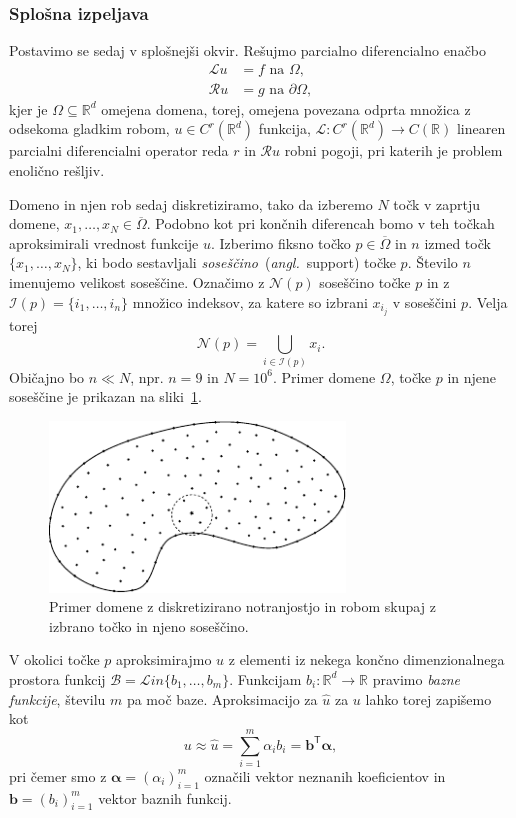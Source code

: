 \documentclass[12pt,a4paper]{article}
\theoremstyle{definition} %
\theoremstyle{plain} %
\numberwithin{equation}{section}
\newcommand{\R}{\mathbb R}
\newcommand{\Rc}{\mathcal{R}}
\newcommand{\Nc}{\mathcal{N}}
\newcommand{\I}{\mathcal{I}}
\newcommand{\B}{\mathcal{B}}
\renewcommand{\L}{\mathcal{L}}
\newcommand{\T}{\mathsf{T}}
\renewcommand{\b}{\boldsymbol}
\newcommand{\zomega}{\overline{\Omega}}
\newcommand{\Lin}{\mathcal{L}in}
\newcommand{\uh}{\hat{u}}
\newcommand{\ang}[1]{(\textit{angl.}\ #1)}
\begin{document}
\subsubsection{Splošna izpeljava}
\label{sec:splosna-izpeljava}
Postavimo se sedaj v splošnejši okvir.
Rešujmo parcialno diferencialno enačbo
\begin{align}
  \L u &= f \text{ na } \Omega, \label{eq:general-problem} \\
  \Rc u &= g \text{ na } \partial \Omega \nonumber,
\end{align}
kjer je $\Omega \subseteq \R^d$ omejena domena, torej, omejena povezana odprta
množica z odsekoma gladkim robom, $u \in C^r(\R^d)$ funkcija,
$\L\colon C^r(\R^d) \to C(\R)$ linearen
parcialni diferencialni operator reda $r$ in $\Rc u$ robni pogoji,
pri katerih je problem enolično rešljiv.

Domeno in njen rob sedaj diskretiziramo, tako da izberemo $N$ točk v zaprtju
domene, $x_1, \dots, x_N \in \zomega$. Podobno kot pri končnih
diferencah bomo v teh točkah aproksimirali vrednost funkcije $u$.
Izberimo fiksno točko $p \in \zomega$ in $n$ izmed točk $\{x_1, \dots, x_N\}$,
ki bodo sestavljali \emph{soseščino}~\ang{support} točke $p$. Število $n$ imenujemo
velikost soseščine. Označimo z $\Nc(p)$ soseščino točke $p$ in
z $\I(p) = \{i_1, \dots, i_n\}$ množico indeksov, za katere so izbrani
$x_{i_j}$ v soseščini $p$. Velja torej \[
  \Nc(p) = \bigcup_{i \in \I(p)} x_i.
\]
Običajno bo $n \ll N$, npr. $n = 9$ in $N = 10^6$.
Primer domene $\Omega$, točke $p$ in njene soseščine je prikazan na
sliki~\ref{fig:domain-example}.

\begin{figure}[ht]
  \centering
  \includegraphics[width=0.7\textwidth]{images/domain_theoretical.pdf}
  \caption{Primer domene z diskretizirano notranjostjo in robom skupaj z izbrano
  točko in njeno soseščino.}
  \label{fig:domain-example}
\end{figure}

V okolici točke $p$ aproksimirajmo $u$ z elementi iz nekega končno
dimenzionalnega prostora funkcij $\B = \Lin\{b_1, \dots, b_m\}$.
Funkcijam $b_i\colon \R^d \to \R$ pravimo \emph{bazne funkcije},
številu $m$ pa moč baze. Aproksimacijo za $\uh$ za $u$ lahko torej zapišemo kot
\[
  u \approx \uh = \sum_{i=1}^m \alpha_i b_i = \b{b}^\T \b{\alpha},
\]
pri čemer smo z $\b{\alpha} = (\alpha_i)_{i=1}^m$ označili vektor neznanih
koeficientov in $\b{b} = (b_i)_{i=1}^m$ vektor baznih funkcij.
\end{document}
